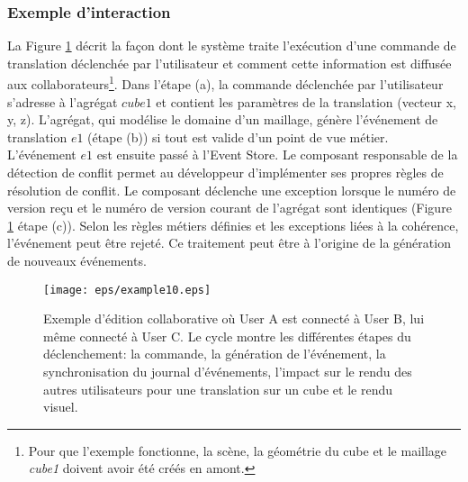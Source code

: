 \subsubsection{Exemple d'interaction}
La Figure \ref{fig:cqrs-example} décrit la façon dont le système traite l'exécution 
d'une commande de translation déclenchée par l'utilisateur et comment cette 
information est diffusée aux collaborateurs\footnote{Pour que l'exemple 
	fonctionne, la scène, la géométrie du cube et le maillage \textit{cube1} doivent 
	avoir été créés en amont.}.
Dans l'étape (a), la commande déclenchée par l'utilisateur s'adresse à l'agrégat 
$cube1$ et contient les paramètres de la translation (vecteur x, y, z). L'agrégat, 
qui 
modélise le domaine d'un maillage, génère l'événement de translation $e1$ (étape 
(b)) si tout est valide d'un point de vue métier. L'événement $e1$ est ensuite 
passé à l'Event Store. 
Le composant responsable de la détection de conflit permet au développeur 
d'implémenter ses propres règles de résolution de conflit. Le composant déclenche 
une exception lorsque le numéro de version reçu et le numéro de version courant 
de l'agrégat sont identiques (Figure \ref{fig:cqrs-example} étape (c)). Selon les 
règles métiers définies et les exceptions liées à la cohérence, l'événement peut 
être 
rejeté. Ce traitement peut être à l'origine de la génération de nouveaux 
événements.


\begin{figure}[]
	\centering
	\texttt{[image: eps/example10.eps]}
	\caption[Flux de la collaboration dans le framework 3DEvent entre 3 
	utilisateurs]{Exemple d'édition collaborative où User A est connecté à User  B, 
		lui 
		même connecté à User C. Le cycle montre les différentes étapes du 
		déclenchement: la commande, la 
		génération 
		de l'événement, la 
		synchronisation du journal d'événements, l'impact sur le rendu des autres 
		utilisateurs pour une translation sur un cube et le rendu 
		visuel.}\label{fig:cqrs-example}
\end{figure}

